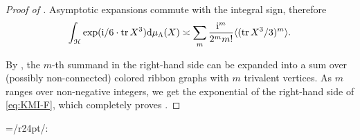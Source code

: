 \begin{proof}[Proof of ]
  Asymptotic expansions commute with the integral sign, therefore
  \begin{equation*}
    \int_{\mathcal{H}} \exp (\mathrm{i}/6 \cdot \operatorname{tr} X^3) \mathrm{d}\mu_\Lambda(X) \asymp \sum_m
    \frac{\mathrm{i}^m}{2^mm!} \langle (\operatorname{tr}
      X^3/3)^m \rangle.
  \end{equation*}
  
  By , the $m$-th summand in the right-hand side
  can be expanded into a sum over (possibly non-connected) colored
  ribbon graphs with $m$ trivalent vertices. As $m$ ranges over
  non-negative integers, we get the exponential of the right-hand side
  of \eqref{eq:KMI-F}, which completely proves .
\end{proof}

\everyxy={/r24pt/:} %

